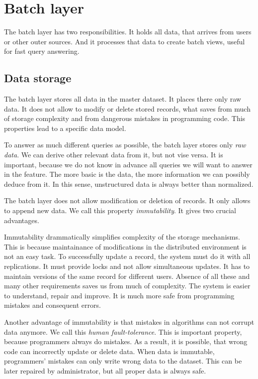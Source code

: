 \section{Batch layer}

The batch layer has two responsibilities.
It holds all data, that arrives from users or other outer sources.
And it processes that data to create batch views, useful for fast query answering.

\subsection{Data storage}

The batch layer stores all data in the master dataset.
It places there only raw data.
It does not allow to modify or delete stored records, what saves from much of storage complexity and from dangerous mistakes in programming code.
This properties lead to a specific data model.

To answer as much different queries as possible, the batch layer stores only \textit{raw data}.
We can derive other relevant data from it, but not vise versa.
It is important, because we do not know in advance all queries we will want to answer in the feature.
The more basic is the data, the more information we can possibly deduce from it.
In this sense, unstructured data is always better than normalized.

The batch layer does not allow modification or deletion of records.
It only allows to append new data.
We call this property \textit{immutability}.
It gives two crucial advantages.

Immutability drammatically simplifies complexity of the storage mechanisms.
This is because maintainance of modifications in the distributed environment is not an easy task.
To successfully update a record, the system must do it with all replications.
It must provide locks and not allow simultaneous updates.
It has to maintain versions of the same record for different users.
Absence of all these and many other requirements saves us from much of complexity.
The system is easier to understand, repair and improve.
It is much more safe from programming mistakes and consequent errors.

Another advantage of immutability is that mistakes in algorithms can not corrupt data anymore.
We call this \textit{human fault-tolerance}.
This is important property, because programmers always do mistakes.
As a result, it is possible, that wrong code can incorrectly update or delete data.
When data is immutable, programmers' mistakes can only write wrong data to the dataset.
This can be later repaired by administrator, but all proper data is always safe.

